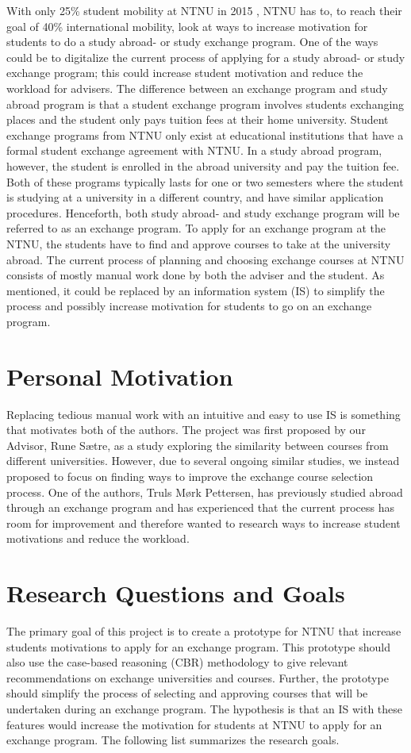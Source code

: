 With only 25\% student mobility at NTNU in 2015 \cite{studentutveksling_andel}, NTNU has to, to reach their goal of 40\% international mobility, look at ways to increase motivation for students to do a study abroad- or study exchange program. One of the ways could be to digitalize the current process of applying for a study abroad- or study exchange program; this could increase student motivation and reduce the workload for advisers. The difference between an exchange program and study abroad program is that a student exchange program involves students exchanging places and the student only pays tuition fees at their home university. Student exchange programs from NTNU only exist at educational institutions that have a formal student exchange agreement with NTNU. In a study abroad program, however, the student is enrolled in the abroad university and pay the tuition fee. Both of these programs typically lasts for one or two semesters where the student is studying at a university in a different country, and have similar application procedures. Henceforth, both study abroad- and study exchange program will be referred to as an exchange program. To apply for an exchange program at the NTNU, the students have to find and approve courses to take at the university abroad. The current process of planning and choosing exchange courses at NTNU consists of mostly manual work done by both the adviser and the student. As mentioned, it could be replaced by an information system (IS) to simplify the process and possibly increase motivation for students to go on an exchange program.

\section{Personal Motivation}
Replacing tedious manual work with an intuitive and easy to use IS is something that motivates both of the authors. The project was first proposed by our Advisor, Rune Sætre, as a study exploring the similarity between courses from different universities. However, due to several ongoing similar studies, we instead proposed to focus on finding ways to improve the exchange course selection process. One of the authors, Truls Mørk Pettersen, has previously studied abroad through an exchange program and has experienced that the current process has room for improvement and therefore wanted to research ways to increase student motivations and reduce the workload.

\section{Research Questions and Goals}\label{RQ}
The primary goal of this project is to create a prototype for NTNU that increase students motivations to apply for an exchange program. This prototype should also use the case-based reasoning (CBR) methodology to give relevant recommendations on exchange universities and courses. Further, the prototype should simplify the process of selecting and approving courses that will be undertaken during an exchange program. The hypothesis is that an IS with these features would increase the motivation for students at NTNU to apply for an exchange program. The following list summarizes the research goals.


